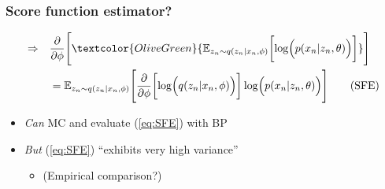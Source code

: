 \documentclass[xcolor=table,dvipsnames]{beamer}
\begin{document}
\begin{frame}[t]
    \frametitle{Score function estimator?}
    \begin{align*}
        \Rightarrow\quad &\frac{\partial}{\partial \phi}\Biggl[\textcolor{OliveGreen}{\mathbb{E}_{z_n\sim q(z_n \vert x_n, \phi)}\biggl[ \log \Bigl(p(x_n \vert z_n, \theta)\Bigr) \biggr]}\Biggr] \\
        &= \mathbb{E}_{z_n\sim q(z_n \vert x_n, \phi)} \Biggl[ \frac{\partial}{\partial \phi}\biggl[\log \Bigl(q(z_n \vert x_n, \phi)\Bigr)\biggr] \log \Bigl(p(x_n \vert z_n, \theta)\Bigr) \Biggr] \tag{SFE} \label{eq:SFE}
    \end{align*}
    \begin{itemize}
        \setlength{\itemsep}{1em}
        \item \emph{Can} MC and evaluate (\ref{eq:SFE}) with BP
        \item \emph{But} (\ref{eq:SFE}) ``exhibits very high variance'' \cite{kingma2013auto}
        \begin{itemize}
            \vspace{1em}
            \item (Empirical comparison?)
        \end{itemize}
    \end{itemize}
\end{frame}
\end{document}
